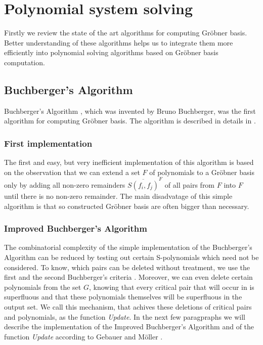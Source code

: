 \chapter{Polynomial system solving}
Firstly we review the state of the art algorithms for computing Gr\"obner basis. Better understanding of these algorithms helps us to integrate them more efficiently into polynomial solving algorithms based on Gr\"obner basis computation.

\section{Buchberger's Algorithm}
Buchberger's Algorithm \cite{Buchberger65}, which was invented by Bruno Buchberger, was the first algorithm for computing Gr\"obner basis. The algorithm is described in details in \cite{Becker93, Cox-Little-Shea97}.

\subsection{First implementation}
The first and easy, but very inefficient implementation of this algorithm is based on the observation that we can extend a set $F$ of polynomials to a Gr\"obner basis only by adding all non-zero remainders $\overline{S(f_i, f_j)}^F$ of all pairs from $F$ into $F$ until there is no non-zero remainder. The main disadvatage of this simple algorithm is that so constructed Gr\"obner basis are often bigger than necessary.



\subsection{Improved Buchberger's Algorithm}
\label{subsec:ImprovedBuchberger}
The combinatorial complexity of the simple implementation of the Buchberger's Algorithm can be reduced by testing out certain S-polynomials which need not be considered. To know, which pairs can be deleted without treatment, we use the first and the second Buchberger's criteria \cite{Becker93}. Moreover, we can even delete certain polynomials from the set $G$, knowing that every critical pair that will occur in is superfluous and that these polynomials themselves will be superfluous in the output set. We call this mechanism, that achives these deletions of critical pairs and polynomials, as the function \textit{Update}.  In the next few paragpraphs we will describe the implementation of the Improved Buchberger's Algorithm and of the function \textit{Update} according to Gebauer and M\"oller \cite{Gebauer-Moller88}.

